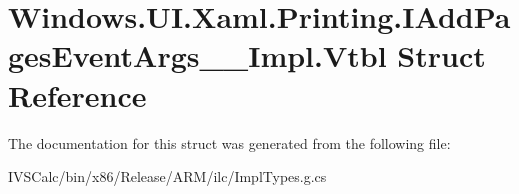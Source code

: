 \hypertarget{struct_windows_1_1_u_i_1_1_xaml_1_1_printing_1_1_i_add_pages_event_args_____impl_1_1_vtbl}{}\section{Windows.\+U\+I.\+Xaml.\+Printing.\+I\+Add\+Pages\+Event\+Args\+\_\+\+\_\+\+Impl.\+Vtbl Struct Reference}
\label{struct_windows_1_1_u_i_1_1_xaml_1_1_printing_1_1_i_add_pages_event_args_____impl_1_1_vtbl}


The documentation for this struct was generated from the following file\+:\begin{DoxyCompactItemize}
\item 
I\+V\+S\+Calc/bin/x86/\+Release/\+A\+R\+M/ilc/Impl\+Types.\+g.\+cs\end{DoxyCompactItemize}
